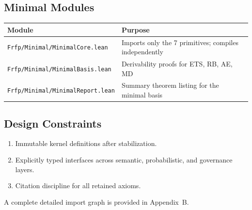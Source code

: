 \subsection{Minimal Modules}

\begin{center}
\begin{tabular}{ll}
\toprule
Module & Purpose \\
\midrule
\texttt{Frfp/Minimal/MinimalCore.lean} & Imports only the 7 primitives; compiles independently \\
\texttt{Frfp/Minimal/MinimalBasis.lean} & Derivability proofs for ETS, RB, AE, MD \\
\texttt{Frfp/Minimal/MinimalReport.lean} & Summary theorem listing for the minimal basis \\
\bottomrule
\end{tabular}
\end{center}

\subsection{Design Constraints}

\begin{enumerate}
  \item Immutable kernel definitions after stabilization.
  \item Explicitly typed interfaces across semantic, probabilistic, and governance layers.
  \item Citation discipline for all retained axioms.
\end{enumerate}

A complete detailed import graph is provided in Appendix~B.
